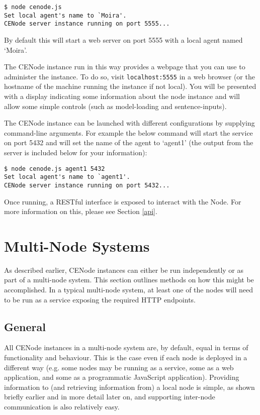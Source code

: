 \documentclass{scrartcl}
\newcommand{\js}[1]{\texttt{#1}}
\begin{document}
\begin{verbatim}
$ node cenode.js
Set local agent's name to `Moira'.
CENode server instance running on port 5555...
\end{verbatim}

By default this will start a web server on port 5555 with a local agent named `Moira'.

The CENode instance run in this way provides a webpage that you can use to administer the instance. To do so, visit \js{localhost:5555} in a web browser (or the hostname of the machine running the instance if not local). You will be presented with a display indicating some information about the node instance and will allow some simple controls (such as model-loading and sentence-inputs).

The CENode instance can be launched with different configurations by supplying command-line arguments. For example the below command will start the service on port 5432 and will set the name of the agent to `agent1' (the output from the server is included below for your information):

\begin{verbatim}
$ node cenode.js agent1 5432
Set local agent's name to `agent1'.
CENode server instance running on port 5432...
\end{verbatim}

Once running, a RESTful interface is exposed to interact with the Node. For more information on this, please see Section \ref{api}.

\section{Multi-Node Systems}
As described earlier, CENode instances can either be run independently or as part of a multi-node system. This section outlines methods on how this might be accomplished. In a typical multi-node system, at least one of the nodes will need to be run as a service exposing the required HTTP endpoints.

\subsection{General}
All CENode instances in a multi-node system are, by default, equal in terms of functionality and behaviour. This is the case even if each node is deployed in a different way (e.g. some nodes may be running as a service, some as a web application, and some as a programmatic JavaScript application). Providing information to (and retrieving information from) a local node is simple, as shown briefly earlier and in more detail later on, and supporting inter-node communication is also relatively easy.
\end{document}
